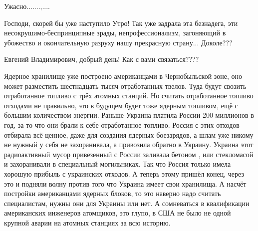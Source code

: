 \begin{itemize}
\begin{itemize}
\end{itemize}

 
Ужасно.......,....

 

Господи, скорей бы уже наступило Утро! Так уже задрала эта безнадега, эти
несокрушимо-беспринципные зрады, непрофессионализм, загоняющий в убожество и
окончательную разруху нашу прекрасную страну... Доколе???


 
Евгений Владимирович, добрый день! Как с вами связаться????

 

Ядерное хранилище уже построено американцами в Чернобыльской зоне, оно может
разместить шестнадцать тысяч отработанных твелов. Туда будут свозить
отработанное топливо с трёх атомных станций. Но считать отработанное топливо
отходами не правильно, это в будущем будет тоже ядерным топливом, ещё с большим
количеством энергии. Раньше Украина платила России 200 миллионов в год, за то
что они брали к себе отработанное топливо. Россия с этих отходов отбирала всё
ценное, даже для создания ядерных боезарядов, а шлам уже никому не нужный у
себя не захоранивала, а привозила обратно в Украину. Украина этот радиоактивный
мусор привезенный с России заливала бетоном , или стекломасой и захоранивали в
специальный могильниках. Так что Россия только имела хорошую прибыль с
украинских отходов. А теперь этому пришёл конец, через это и подняли волну
против того что Украина имеет свои хранилища. А насчёт постройки американцами
ядерных блоков, то это наверно надо считать специалистам, нужны они для Украины
или нет. А сомневаться в квалификации американских инженеров атомщиков, это
глупо, в США не было не одной крупной аварии на атомных станциях за всю
историю.


\end{itemize}
